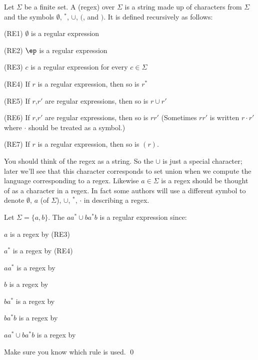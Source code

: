 \begin{defn} Let $\Sigma$ be a finite set. A  (regex) over $\Sigma$ is a string 
made up of characters from $\Sigma$ and the symbols $\emptyset$, 
${}^*$, $\cup$, $($, and $)$.
It is defined 
recursively as follows:
\begin{axioms}
\item[(RE1)] $\emptyset$ is a regular expression
\item[(RE2)] $\ep$ is a regular expression
\item[(RE3)] $c$ is a regular expression for every $c \in \Sigma$
\item[(RE4)] If $r$ is a regular expression, then so is $r^*$
\item[(RE5)] If $r$,$r'$ are regular expressions, then so is $r
  \cup r'$
\item[(RE6)] If $r$,$r'$ are regular expressions, then so is $rr'$
  (Sometimes $rr'$ is written $r \cdot r'$ where $\cdot$
  should be treated as a symbol.)
\item[(RE7)] If $r$ is a regular expression, then so is
$(r)$.
\end{axioms}
\end{defn}

You should think of the regex as a string. So the $\cup$ is just a
special character; later we'll see that this character corresponds
to set union when we compute the language corresponding to a regex.
Likewise $a \in \Sigma$ is a regex should be thought of
as a character in a regex. In fact some authors will use a
different symbol to denote $\emptyset$, $a$ (of $\Sigma$), $\cup$,
${}^*$, $\cdot$ in describing a regex.

\begin{eg}
Let $\Sigma = \{a,b\}$. The $aa^* \cup ba^*b$ is a regular
expression since: 
\begin{tightlist}
 \item $a$ is a regex by (RE3)
 \item $a^*$ is a regex by (RE4)
 \item $aa^*$ is a regex by  
 \item $b$ is a regex by 
 \item $ba^*$ is a regex by
 \item $ba^*b$ is a regex by 
 \item $aa^* \cup ba^*b$ is a regex by
\end{tightlist}
Make sure you know which rule is used.
\qed
\end{eg}

